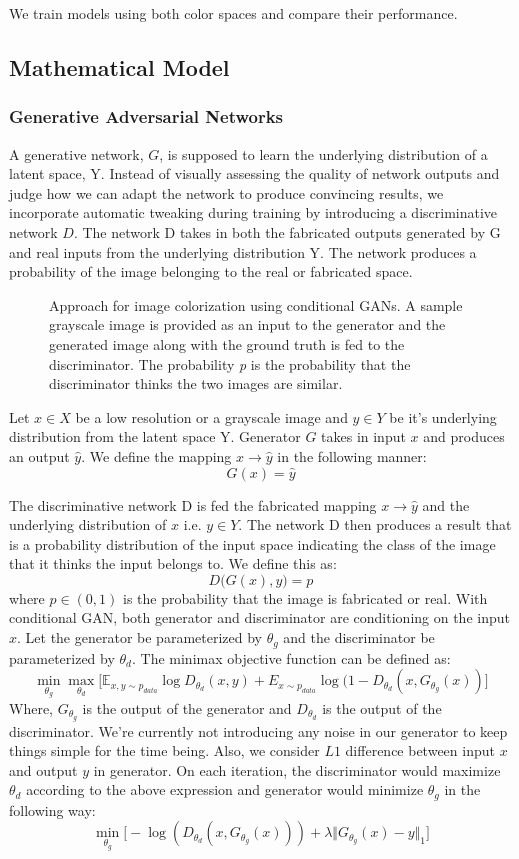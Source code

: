 \documentclass[conference]{IEEEtran}
\begin{document}
We train models using both color spaces and compare their performance.
\subsection{Mathematical Model}
\subsubsection{Generative Adversarial Networks}
 A generative network, $G$, is supposed to learn the underlying distribution of a latent space, Y. Instead of visually assessing the quality of network outputs and judge how we can adapt the network to produce convincing results, we incorporate automatic tweaking during training by introducing a discriminative network $D$. The network D takes in both the fabricated outputs generated by G and real inputs from the underlying distribution Y. The network produces a probability of the image belonging to the real or fabricated space.
\begin{figure}[!htb]
    \centering
    
    \caption{Approach for image colorization using conditional GANs. A sample grayscale image is provided as an input to the generator and the generated image along with the ground truth is fed to the discriminator. The probability \textit{p} is the probability that the discriminator thinks the two images are similar.}
    \label{fig:gan_visualization}
\end{figure}
  Let $x \in X$ be a low resolution or a grayscale image and $y \in Y$ be it's underlying distribution from the latent space Y. Generator $G$ takes in input $x$ and produces an output $\hat{y}$. We define the mapping $x \rightarrow \hat{y}$ in the following manner:
  $$G(x) = \hat{y}$$

 The discriminative network D is fed the fabricated mapping $x \rightarrow \hat{y}$ and the underlying distribution of $x$ i.e. $y \in Y$. The network D then produces a result that is a probability distribution of the input space indicating the class of the image that it thinks the input belongs to. We define this as:
 $$D\big(G(x),y\big) = p$$
 where $p \in (0,1)$ is the probability that the image is fabricated or real.
With conditional GAN, both generator and discriminator are conditioning on the input $x$. Let the generator be parameterized by $\theta_g$ and the discriminator be parameterized by $\theta_d$. The minimax objective function can be defined as:
	\begingroup\makeatletter\def\f@size{7}\check@mathfonts \[
		\min_{\theta_g}\max_{\theta_d}\Big[\mathbb{E}_{x,y\sim p_{data}} \log D_{\theta_d}(x,y) + E_{x\sim p_{data}} \log(1 - D_{\theta_d}(x, G_{\theta_g}(x))\Big]
	\] \endgroup
    \normalsize
Where, $G_{\theta_{g}}$ is the output of the generator and $D_{\theta_d}$ is the output of the discriminator.
We're currently not introducing any noise in our generator to keep things simple for the time being. Also, we consider $L1$ difference between input $x$ and output $y$ in generator. On each iteration, the discriminator would maximize $\theta_d$ according to the above expression and generator would minimize $\theta_g$ in the following way:
	\[
		\min_{\theta_g}\Big[-\log(D_{\theta_d}(x,G_{\theta_g}(x)))+\lambda \Vert G_{\theta_g}(x) - y \Vert_1 \Big]
	\]
\end{document}

